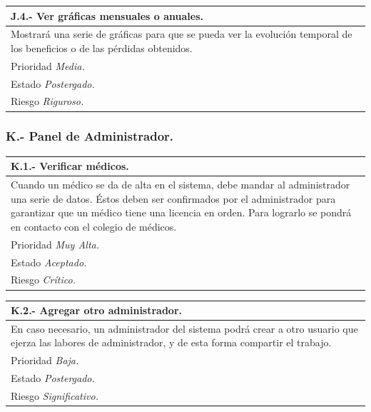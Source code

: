 \documentclass[a4paper,oneside,11pt]{book}
\begin{document}
\begin{center}
\begin{tabulary}{15cm}{|L|}
	\hline
		\bf{J.4.- Ver gráficas mensuales o anuales.} \\
	\hline
		Mostrará una serie de gráficas para que se pueda ver la evolución temporal de los beneficios o de las pérdidas obtenidos. \\
	\hline
		Prioridad \textit{Media.} \\
	\hline
		Estado \textit{Postergado.} \\
	\hline
		Riesgo \textit{Riguroso.} \\
	\hline
\end{tabulary}
\end{center}

\subsubsection{K.- Panel de Administrador.}

\begin{center}
\begin{tabulary}{15cm}{|L|}
	\hline
		\bf{K.1.- Verificar médicos.} \\
	\hline
		Cuando un médico se da de alta en el sistema, debe mandar al administrador una serie de datos. Éstos deben ser confirmados por el administrador para garantizar que un médico tiene una licencia en orden. Para lograrlo se pondrá en contacto con el colegio de médicos. \\
	\hline
		Prioridad \textit{Muy Alta.} \\
	\hline
		Estado \textit{Aceptado.} \\
	\hline
		Riesgo \textit{Crítico.} \\
	\hline
\end{tabulary}
\end{center}

\begin{center}
\begin{tabulary}{15cm}{|L|}
	\hline
		\bf{K.2.- Agregar otro administrador.} \\
	\hline
		En caso necesario, un administrador del sistema podrá crear a otro usuario que ejerza las labores de administrador, y de esta forma compartir el trabajo. \\
	\hline
		Prioridad \textit{Baja.} \\
	\hline
		Estado \textit{Postergado.} \\
	\hline
		Riesgo \textit{Significativo.} \\
	\hline
\end{tabulary}
\end{center}
\end{document}

